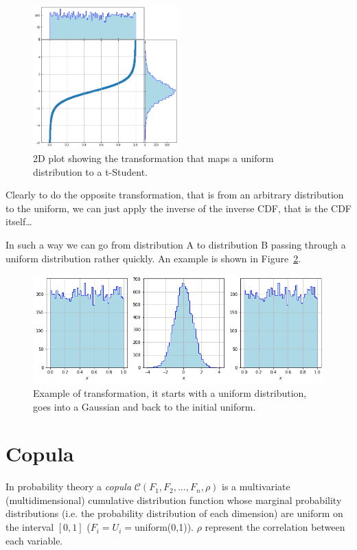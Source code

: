 \begin{figure}[htbp]
  \centering
  \includegraphics[width=0.5\textwidth]{figures/lesson6_9_0.png}
  \caption{2D plot showing the transformation that maps a uniform distribution to a t-Student.}
  \label{fig:uniform_to_tstudent}
\end{figure}

Clearly to do the opposite transformation, that is from an arbitrary distribution
to the uniform, we can just apply the inverse of the inverse CDF, that is the CDF itself\ldots

In such a way we can go from distribution A to distribution B passing through 
a uniform distribution rather quickly. An example is shown in Figure~\ref{fig:a_to_b_to_a}.

\begin{figure}[htbp]
	\centering
	\includegraphics[width=1.\textwidth]{figures/lesson6_11_0.png}
	\caption{Example of transformation, it starts with a uniform distribution, goes into a Gaussian and back to the initial uniform.}
	\label{fig:a_to_b_to_a}
\end{figure}

\section{Copula}\label{copula}

In probability theory a \emph{copula} $\mathcal{C}(F_1, F_2, \ldots, F_n, \rho)$
is a multivariate (multidimensional) cumulative distribution function
whose marginal probability distributions (i.e. the probability
distribution of each dimension) are uniform on the
interval \([0, 1]\) (\(F_i = U_i =\)uniform(0,1)).
\(\rho\) represent the correlation between each variable.

